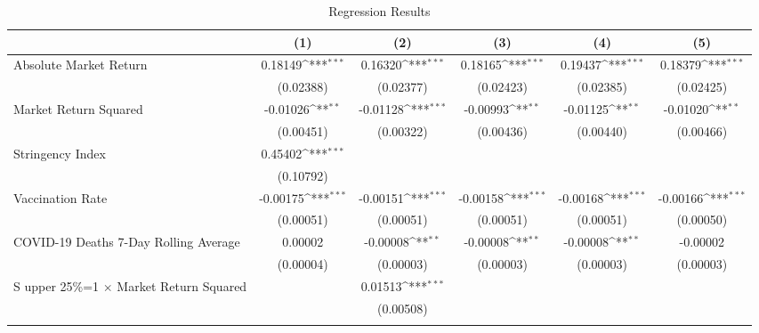 \begin{table}[htbp]\centering
\def\sym#1{\ifmmode^{#1}\else\(^{#1}\)\fi}
\caption{Regression Results \label{reg1}}
\begin{tabular}{l*{5}{c}}
\toprule
                    &\multicolumn{1}{c}{(1)}         &\multicolumn{1}{c}{(2)}         &\multicolumn{1}{c}{(3)}         &\multicolumn{1}{c}{(4)}         &\multicolumn{1}{c}{(5)}         \\
\midrule
Absolute Market Return&     0.18149\sym{***}&     0.16320\sym{***}&     0.18165\sym{***}&     0.19437\sym{***}&     0.18379\sym{***}\\
                    &   (0.02388)         &   (0.02377)         &   (0.02423)         &   (0.02385)         &   (0.02425)         \\
\addlinespace
Market Return Squared&    -0.01026\sym{**} &    -0.01128\sym{***}&    -0.00993\sym{**} &    -0.01125\sym{**} &    -0.01020\sym{**} \\
                    &   (0.00451)         &   (0.00322)         &   (0.00436)         &   (0.00440)         &   (0.00466)         \\
\addlinespace
Stringency Index    &     0.45402\sym{***}&                     &                     &                     &                     \\
                    &   (0.10792)         &                     &                     &                     &                     \\
\addlinespace
Vaccination Rate    &    -0.00175\sym{***}&    -0.00151\sym{***}&    -0.00158\sym{***}&    -0.00168\sym{***}&    -0.00166\sym{***}\\
                    &   (0.00051)         &   (0.00051)         &   (0.00051)         &   (0.00051)         &   (0.00050)         \\
\addlinespace
COVID-19 Deaths 7-Day Rolling Average&     0.00002         &    -0.00008\sym{**} &    -0.00008\sym{**} &    -0.00008\sym{**} &    -0.00002         \\
                    &   (0.00004)         &   (0.00003)         &   (0.00003)         &   (0.00003)         &   (0.00003)         \\
\addlinespace

S upper 25\%=1 $\times$ Market Return Squared&                     &     0.01513\sym{***}&                     &                     &                     \\
                    &                     &   (0.00508)         &                     &                     &                     \\
\addlinespace
  

\end{tabular}
\end{table}
